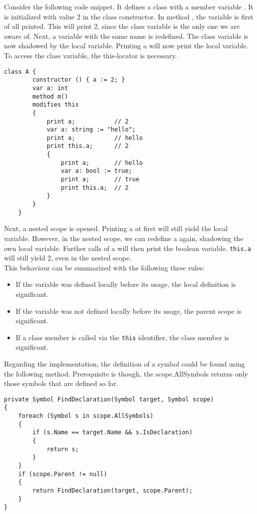 Consider the following code snippet. It defines a class with a member variable . It is initialized with value 2 in the class constructor. In method , the variable  is first of all printed. This will print 2, since the class variable is the only one we are aware of. Next, a variable with the same name is redefined. The class variable is now shadowed by the local variable. Printing a will now print the local variable. To access the class variable, the this-locator is necessary.

\begin{lstlisting}[caption={Complex Shadowing Example}, captionpos=b, label={lst:shadowing}]
    class A {
        constructor () { a := 2; }
        var a: int
        method m() 
        modifies this
        {
            print a;           // 2
            var a: string := "hello";
            print a;           // hello
            print this.a;      // 2
            {
                print a;       // hello
                var a: bool := true;
                print a;       // true
                print this.a;  // 2
            }
        }
    }
\end{lstlisting}

Next, a nested scope is opened. Printing a at first will still yield the local variable. However, in the nested scope, we can redefine a again, shadowing the own local variable. Further calls of a will then print the boolean variable. \texttt{this.a} will still yield 2, even in the nested scope.\\

This behaviour can be summarized with the following three rules:
\begin{itemize}
    \item If the variable was defined locally before its usage, the local definition is significant.
    \item If the variable was not defined locally before its usage, the parent scope is significant.
    \item If a class member is called via the \texttt{this} identifier, the class member is significant.
\end{itemize}

Regarding the implementation, the definition of a symbol could be found using the following method. Prerequisite is though, the scope.AllSymbols returns only those symbols that are defined so far.

\lstset{style=sharpc}
\begin{lstlisting}[caption={Finding Symbol Definition}, captionpos=b, label={lst:findsymbol}]
private Symbol FindDeclaration(Symbol target, Symbol scope)
{
    foreach (Symbol s in scope.AllSymbols)
    {
        if (s.Name == target.Name && s.IsDeclaration)
        {
            return s;
        }
    }
    if (scope.Parent != null)
    {
        return FindDeclaration(target, scope.Parent);
    }
}
\end{lstlisting}

